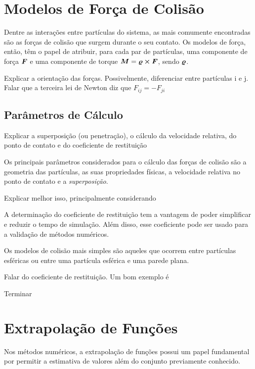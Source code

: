 \section{Modelos de Força de Colisão} \label{sec:collision_force_models}

Dentre as interações entre partículas do sistema, as mais comumente encontradas são as forças de colisão que surgem durante o seu contato. Os modelos de força, então, têm o papel de atribuir, para cada par de partículas, uma componente de força \(\bm{F}\) e uma componente de torque \(\bm{M} = \bm{\varrho}\cross\bm{F}\), sendo \(\bm{\varrho}\).

\alert{Explicar a orientação das forças. Possivelmente, diferenciar entre partículas i e j. Falar que a terceira lei de Newton diz que \(F_{ij} = - F_{ji}\)}

\subsection{Parâmetros de Cálculo}

\alert{Explicar a superposição (ou penetração), o cálculo da velocidade relativa, do ponto de contato e do coeficiente de restituição}

Os principais parâmetros considerados para o cálculo das forças de colisão são a geometria das partículas, as suas propriedades físicas, a velocidade relativa no ponto de contato e a \textit{superposição}. 

\alert{Explicar melhor isso, principalmente considerando }

A determinação do coeficiente de restituição tem a vantagem de poder simplificar e reduzir o tempo de simulação. Além disso, esse coeficiente pode ser usado para a validação de métodos numéricos. 

Os modelos de colisão mais simples são aqueles que ocorrem entre partículas esféricas ou entre uma partícula esférica e uma parede plana.

\alert{Falar do coeficiente de restituição. Um bom exemplo é }

\alert{Terminar}

\section{Extrapolação de Funções}
\label{sec:extrapolation}

Nos métodos numéricos, a extrapolação de funções possui um papel fundamental por permitir a estimativa de valores além do conjunto previamente conhecido.

